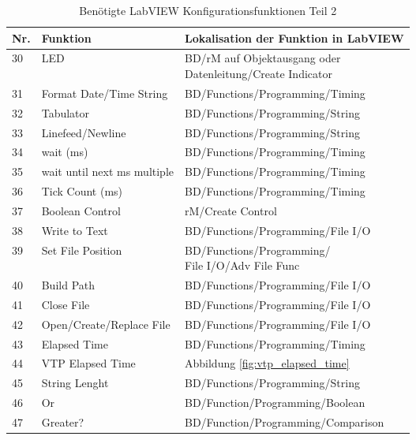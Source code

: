 \begin{table}[b!p] %
\caption{Benötigte LabVIEW Konfigurationsfunktionen Teil 2}
\begin{center}
\begin{tabularx}{1\textwidth}{m{0.5cm}m{4.5cm}X}
\hline
Nr. & Funktion & Lokalisation der Funktion in LabVIEW \\
\hline
30 & LED & \makecell[l]{BD/rM auf Objektausgang oder\\ Datenleitung/Create Indicator} \\
31 & Format Date/Time String & BD/Functions/Programming/Timing \\
32 & Tabulator & BD/Functions/Programming/String \\
33 & Linefeed/Newline & BD/Functions/Programming/String \\
34 & wait (ms) & BD/Functions/Programming/Timing \\
35 & wait until next ms multiple & BD/Functions/Programming/Timing \\
36 & Tick Count (ms) & BD/Functions/Programming/Timing \\
37 & Boolean Control & rM/Create Control \\
38 & Write to Text & BD/Functions/Programming/File I/O \\
39 & Set File Position & \makecell[l]{BD/Functions/Programming/\\File I/O/Adv File Func} \\
40 & Build Path & BD/Functions/Programming/File I/O \\
41 & Close File & BD/Functions/Programming/File I/O \\
42 & Open/Create/Replace File & BD/Functions/Programming/File I/O \\
43 & Elapsed Time & BD/Functions/Programming/Timing \\
44 & VTP Elapsed Time & Abbildung \ref{fig:vtp_elapsed_time} \\ 
45 & String Lenght & BD/Functions/Programming/String \\
46 & Or & BD/Function/Programming/Boolean \\ 
47 & Greater? & BD/Function/Programming/Comparison \\

\end{tabularx}
\end{center}
\label{tab:labviewserialobject2}
\end{table} 